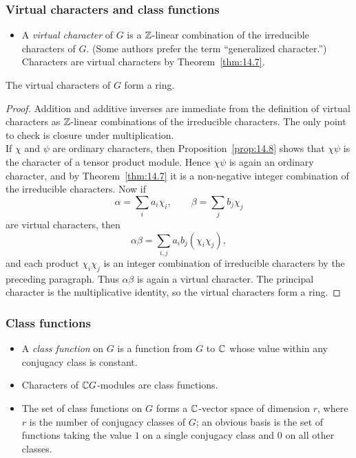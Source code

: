 \documentclass[../Odyssey_Project.tex]{subfiles}
\begin{document}
\subsubsection*{Virtual characters and class functions}
\begin{itemize}
    \item A \emph{virtual character} of $G$ is a $\mathbb{Z}$-linear combination of the irreducible characters of $G$. (Some authors prefer the term ``generalized character.'') Characters are virtual characters by Theorem~\ref{thm:14.7}.
\end{itemize}

\begin{corollary}
\label{cor:14.9}
The virtual characters of $G$ form a ring.
\end{corollary}
\begin{proof}
    Addition and additive inverses are immediate from the definition of virtual characters as $\mathbb{Z}$-linear combinations of the irreducible characters. The only point to check is closure under multiplication.\\
    If $\chi$ and $\psi$ are ordinary characters, then Proposition~\ref{prop:14.8} shows that $\chi\psi$ is the character of a tensor product module. Hence $\chi\psi$ is again an ordinary character, and by Theorem~\ref{thm:14.7} it is a non-negative integer combination of the irreducible characters. Now if
    \[
        \alpha=\sum_i a_i\chi_i,
        \qquad
        \beta=\sum_j b_j\chi_j
    \]
    are virtual characters, then
    \[
        \alpha\beta=\sum_{i,j}a_i b_j(\chi_i\chi_j),
    \]
    and each product $\chi_i\chi_j$ is an integer combination of irreducible characters by the preceding paragraph. Thus $\alpha\beta$ is again a virtual character. The principal character is the multiplicative identity, so the virtual characters form a ring.
\end{proof}

\subsubsection*{Class functions}
\begin{itemize}
    \item A \emph{class function} on $G$ is a function from $G$ to $\mathbb{C}$ whose value within any conjugacy class is constant.
    \item Characters of $\mathbb{C} G$-modules are class functions.
    \item The set of class functions on $G$ forms a $\mathbb{C}$-vector space of dimension $r$, where $r$ is the number of conjugacy classes of $G$; an obvious basis is the set of functions taking the value $1$ on a single conjugacy class and $0$ on all other classes.
\end{itemize}
\end{document}
